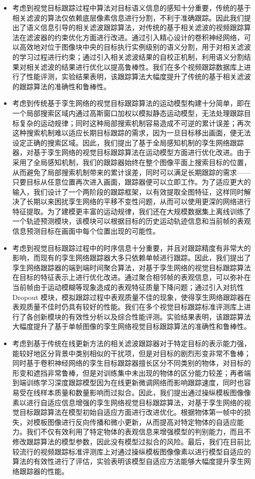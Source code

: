 \begin{itemize}
\item 考虑到视觉目标跟踪过程中算法对目标语义信息的感知十分重要，传统的基于相关滤波的算法仅依赖底层像素信息进行分割，不利于准确跟踪。因此我们提出了语义信息引导的相关滤波跟踪算法，对传统的基于相关滤波的视频跟踪算法在滤波器的约束优化方面进行改进。通过引入精心设计的卷积神经网络，可以高效地对位于图像块中央的目标执行实例级别的语义分割，用于对相关滤波的学习过程进行约束；通过引入相关滤波结果的自校正机制，利用语义分割结果对相关滤波的结果进行优化以提高鲁棒性。我们在多个视频跟踪数据库上进行了性能评测，实验结果表明，该跟踪算法大幅度提升了传统的基于相关滤波的跟踪算法的准确性和鲁棒性。
\item 考虑到传统基于孪生网络的视觉目标跟踪算法的运动模型构建十分简单，即在一个局部搜索区域内通过高斯窗口加权以模拟静态运动模型，无法处理跟踪目标复杂的运动规律；同时这种局部搜索机制容易造成不可逆的累计误差；再次这种搜索机制难以适应长期目标跟踪的需求，因为一旦目标移出画面，便无法设定正确的搜索区域。因此，我们提出了基于全局感知机制的孪生网络跟踪器，对基于孪生网络的视觉目标跟踪算法在运动模型方面进行优化改进。由于采用了全局感知机制，我们的跟踪器始终在整个图像平面上搜索目标的位置，从而避免了局部搜索机制带来的累计误差，同时可以满足长期跟踪的需求——只要目标从任意位置再次进入画面，跟踪器便可以立即工作。为了适应更大的输入，我们设计了一个两阶段的跟踪框架，以有效提取全图特征，这样同时解决了长期以来困扰孪生网络的平移不变性问题，从而可以使用更深的网络进行特征提取。为了建模更丰富的运动规律，我们还在大规模数据集上离线训练了一个轨迹预测模块，该模块可以根据目标的历史运动轨迹信息和当前帧的表观信息预测目标在画面中每个位置出现的可能性。
\item 考虑到视觉目标跟踪过程中的时序信息十分重要，并且对跟踪精度有非常大的影响，而现有的孪生网络跟踪器大多只依赖单帧进行跟踪。因此，我们提出了孪生网络跟踪器的端到端时间聚合算法，对基于孪生网络的视觉目标跟踪算法在目标的特征表示上进行优化改进。通过聚合相邻帧的表观信息，可以弥补在当前帧由于运动模糊等现象造成的表观特征质量下降问题；通过引入对抗性 Dropout 模块，模拟跟踪过程中表观质量不佳的现象，使得孪生网络跟踪器在表观质量不佳时仍具有较好的性能。我们在多个视觉目标跟踪标准评测库上进行了各创新模块的有效性分析以及综合性能评测。实验结果表明，该跟踪算法大幅度提升了基于单帧图像的孪生网络视觉目标跟踪算法的准确性和鲁棒性。
\item 考虑到基于传统在线更新方法的相关滤波跟踪器对于特定目标的表示能力强，能较好地区分背景中类别相似的干扰项，但是对目标的剧烈形变非常不鲁棒；同时基于卷积神经网络的孪生目标跟踪器擅长区分不同类别的物体，对目标的形变和遮挡非常鲁棒，但是对训练集中未出现的物体的区分能力较差；再者端到端训练学习深度跟踪模型因为在线更新微调网络而影响跟踪速度，同时也容易受在线样本质量和数量影响而过拟合。因此，我们提出通过操纵模板图像像素以进行自适应信息增强的孪生网络视觉目标跟踪算法，对基于孪生网络的视觉目标跟踪算法在模型初始自适应方面进行改进优化。根据物体第一帧中的损失，对模板图像进行反向传播和微小更新，从而提高对特定物体的自适应能力。我们不仅有效利用了特定物体的表观信息来增强模型的判别能力，而且不修改跟踪算法的模型参数，因此没有模型过拟合的风险。最后，我们在目前比较流行的视频跟踪标准评测库上对通过操纵模板图像像素以进行模型自适应的算法的有效性进行了评估，实验表明该模型自适应方法能够大幅度提升孪生网络跟踪器的性能。

\end{itemize}
